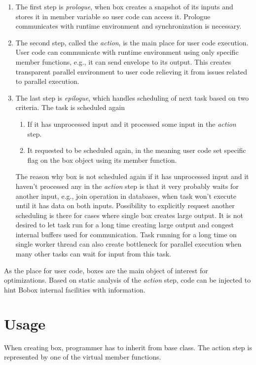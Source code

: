 \begin{enumerate}
\item The first step is \textit{prologue}, when box creates a snapshot of its inputs and stores it in member variable so user code can access it. Prologue communicates with runtime environment and synchronization is necessary.
\item The second step, called the \textit{action}, is the main place for user code execution. User code can communicate with runtime environment using only specific member functions, e.g., it can send envelope to its output. This creates transparent parallel environment to user code relieving it from issues related to parallel execution.
\item The last step is \textit{epilogue}, which handles scheduling of next task based on two criteria. The task is scheduled again

\begin{enumerate}
\item If it has unprocessed input and it processed some input in the \textit{action} step.
\item It requested to be scheduled again, in the meaning user code set specific flag on the box object using its member function.
\end{enumerate}

The reason why box is not scheduled again if it has unprocessed input and it haven't processed any in the \textit{action} step is that it very probably waits for another input, e.g., join operation in databases, when task won't execute until it has data on both inputs. Possibility to explicitly request another scheduling is there for cases where single box creates large output. It is not desired to let task run for a long time creating large output and congest internal buffers used for communication. Task running for a long time on single worker thread can also create bottleneck for parallel execution when many other tasks can wait for input from this task.

\end{enumerate}

As the place for user code, boxes are the main object of interest for  optimizations. Based on static analysis of the \textit{action} step, code can be injected to hint Bobox internal facilities with information.

\section{Usage}
When creating box, programmer has to inherit from  base class. The action step is represented by one of the virtual member functions.

